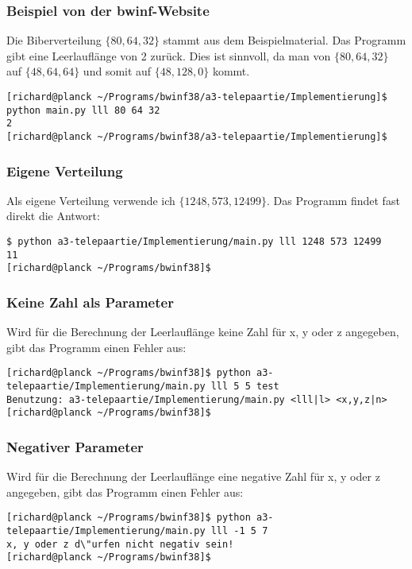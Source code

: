 \documentclass[a4paper,10pt,ngerman]{scrartcl}
\begin{document}
\subsubsection{Beispiel von der bwinf-Website}
Die Biberverteilung $\{80,64,32\}$ stammt aus dem Beispielmaterial.
Das Programm gibt eine Leerlauflänge von 2 zurück.
Dies ist sinnvoll, da man von $\{80,64,32\}$ auf $\{48,64,64\}$ und somit auf $\{48,128,0\}$ kommt.
\begin{lstlisting}
[richard@planck ~/Programs/bwinf38/a3-telepaartie/Implementierung]$ python main.py lll 80 64 32
2
[richard@planck ~/Programs/bwinf38/a3-telepaartie/Implementierung]$ 
\end{lstlisting}

\subsubsection{Eigene Verteilung}
Als eigene Verteilung verwende ich $\{1248, 573, 12499\}$.
Das Programm findet fast direkt die Antwort:
\begin{lstlisting}
$ python a3-telepaartie/Implementierung/main.py lll 1248 573 12499
11
[richard@planck ~/Programs/bwinf38]$ 
\end{lstlisting}

\subsubsection{Keine Zahl als Parameter}
Wird für die Berechnung der Leerlauflänge keine Zahl für x, y oder z angegeben, gibt das Programm einen Fehler aus:
\begin{lstlisting}
[richard@planck ~/Programs/bwinf38]$ python a3-telepaartie/Implementierung/main.py lll 5 5 test
Benutzung: a3-telepaartie/Implementierung/main.py <lll|l> <x,y,z|n>
[richard@planck ~/Programs/bwinf38]$ 
\end{lstlisting}

\subsubsection{Negativer Parameter}
Wird für die Berechnung der Leerlauflänge eine negative Zahl für x, y oder z angegeben, gibt das Programm einen Fehler aus:
\begin{lstlisting}
[richard@planck ~/Programs/bwinf38]$ python a3-telepaartie/Implementierung/main.py lll -1 5 7
x, y oder z d\"urfen nicht negativ sein!
[richard@planck ~/Programs/bwinf38]$
\end{lstlisting}
\end{document}
